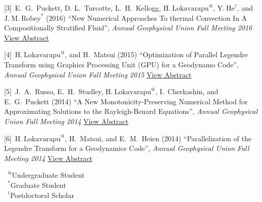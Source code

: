 \documentclass[11pt]{ltxdoc}
\begin{document}
\hangindent 20pt
[3]~E.~G.~Puckett, D. L.~Turcotte, L.~H.~Kellogg, $\mathrm{H.~Lokavarapu}^{@}$,  $\mathrm{Y.~He}^{\dagger}$, and $\mathrm{J.~M.~Robey}^{*}$ (2016) 
``New Numerical Approaches To thermal Convection In A Compositionally Stratified Fluid'', 
\textit{Annual Geophysical Union Fall Meeting 2016}
\href{http://adsabs.harvard.edu/abs/2016AGUFMDI23A2589P}{View Abstract}

\hangindent 20pt
[4]~$\mathrm{H.~Lokavarapu}^{@}$, and H.~Matsui (2015) 
``Optimization of Parallel Legendre Transform using Graphics Processing Unit (GPU) for a Geodynamo Code'', 
\textit{Annual Geophysical Union Fall Meeting 2015}
\href{http://adsabs.harvard.edu/abs/2015AGUFMGP43B1253L}{View Abstract}

\hangindent 20pt
[5]~J.~A.~Russo, E.~H.~Studley, $\mathrm{H.~Lokavarapu}^{@}$, I.~Cherkashin, and E.~G.~Puckett (2014) 
``A New Monotonicity-Preserving Numerical Method for Approximating Solutions to the Rayleigh-Benard Equations'', 
\textit{Annual Geophysical Union Fall Meeting 2014}
\href{http://adsabs.harvard.edu/abs/2014AGUFMDI11A4258R}{View Abstract}

\hangindent 20pt
[6]~$\mathrm{H.~Lokavarapu}^{@}$, H.~Matsui, and E.~M.~Heien (2014) 
``Parallelization of the Legendre Transform for a Geodynamics Code'', 
\textit{Annual Geophysical Union Fall Meeting 2014}
\href{http://adsabs.harvard.edu/abs/2014AGUFMDI11A4255L}{View Abstract}

\vskip 18pt

$\phantom{0}^@$Undergraduate Student        \\
$\phantom{0}^*$Graduate Student             \\
$\phantom{0}^{\dagger}$Postdoctoral Scholar
\end{document}
